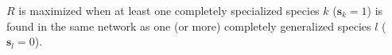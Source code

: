 $R$ is maximized when at least one completely specialized species $k$
($\mathbf{s}_{k} = 1$) is found in the same network as one (or more)
completely generalized species $l$ ($\mathbf{s}_{l} = 0$).
